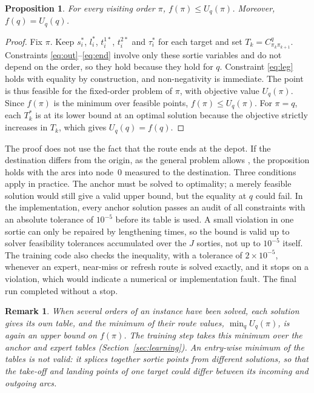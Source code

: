 \documentclass[preprint,12pt,authoryear]{elsarticle}
\newtheorem{proposition}{Proposition}
\newtheorem{remark}{Remark}
\begin{document}
\begin{proposition}
\label{prop:bound}
For every visiting order $\pi$, $f(\pi) \le U_{q}(\pi)$. Moreover, $f(q) = U_{q}(q)$.
\end{proposition}

\begin{proof}
Fix $\pi$. Keep $s^{*}_{i}$, $l^{*}_{i}$, $t^{1*}_{i}$, $t^{2*}_{i}$ and $\tau^{*}_{i}$ for each target and set $T_{k} = C^{q}_{\pi_{k}\pi_{k+1}}$. Constraints \eqref{eq:out}--\eqref{eq:end} involve only these sortie variables and do not depend on the order, so they hold because they hold for $q$. Constraint \eqref{eq:leg} holds with equality by construction, and non-negativity is immediate. The point is thus feasible for the fixed-order problem of $\pi$, with objective value $U_{q}(\pi)$. Since $f(\pi)$ is the minimum over feasible points, $f(\pi) \le U_{q}(\pi)$. For $\pi = q$, each $T^{*}_{k}$ is at its lower bound at an optimal solution because the objective strictly increases in $T_{k}$, which gives $U_{q}(q) = f(q)$.
\end{proof}

The proof does not use the fact that the route ends at the depot. If the destination differs from the origin, as the general problem allows \citep{erdogan2021}, the proposition holds with the arcs into node~$0$ measured to the destination. Three conditions apply in practice. The anchor must be solved to optimality; a merely feasible solution would still give a valid upper bound, but the equality at $q$ could fail. In the implementation, every anchor solution passes an audit of all constraints with an absolute tolerance of $10^{-5}$ before its table is used. A small violation in one sortie can only be repaired by lengthening times, so the bound is valid up to solver feasibility tolerances accumulated over the $J$ sorties, not up to $10^{-5}$ itself. The training code also checks the inequality, with a tolerance of $2 \times 10^{-5}$, whenever an expert, near-miss or refresh route is solved exactly, and it stops on a violation, which would indicate a numerical or implementation fault. The final run completed without a stop.

\begin{remark}
\label{rem:combine}
When several orders of an instance have been solved, each solution gives its own table, and the minimum of their route values, $\min_{q} U_{q}(\pi)$, is again an upper bound on $f(\pi)$. The training step takes this minimum over the anchor and expert tables (Section~\ref{sec:learning}). An entry-wise minimum of the tables is not valid: it splices together sortie points from different solutions, so that the take-off and landing points of one target could differ between its incoming and outgoing arcs.
\end{remark}
\end{document}

